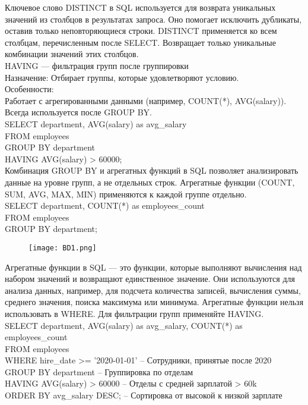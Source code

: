 \noindent Ключевое слово DISTINCT в SQL используется для возврата уникальных значений из столбцов в результатах запроса. Оно помогает исключить дубликаты, оставив только неповторяющиеся строки. DISTINCT применяется ко всем столбцам, перечисленным после SELECT. Возвращает только уникальные комбинации значений этих столбцов. \\

\noindent HAVING — фильтрация групп после группировки \\
Назначение: Отбирает группы, которые удовлетворяют условию. \\
Особенности: \\
Работает с агрегированными данными (например, COUNT(*), AVG(salary)). \\
Всегда используется после GROUP BY. \\
SELECT department, AVG(salary) as avg\_salary \\
FROM employees \\
GROUP BY department \\
HAVING AVG(salary) > 60000; \\

\noindent Комбинация GROUP BY и агрегатных функций в SQL позволяет анализировать данные на уровне групп, а не отдельных строк. Агрегатные функции (COUNT, SUM, AVG, MAX, MIN) применяются к каждой группе отдельно. \\
SELECT department, COUNT(*) as employees\_count \\
FROM employees \\
GROUP BY department; \\
\begin{figure}[H]
    \centering
    \texttt{[image: BD1.png]}
\end{figure}

\noindent Агрегатные функции в SQL — это функции, которые выполняют вычисления над набором значений и возвращают единственное значение. Они используются для анализа данных, например, для подсчета количества записей, вычисления суммы, среднего значения, поиска максимума или минимума. Агрегатные функции нельзя использовать в WHERE. Для фильтрации групп применяйте HAVING. \\
SELECT department, AVG(salary) as avg\_salary, COUNT(*) as employees\_count \\
FROM employees \\
WHERE hire\_date >= '2020-01-01'  -- Сотрудники, принятые после 2020 \\
GROUP BY department              -- Группировка по отделам \\
HAVING AVG(salary) > 60000      -- Отделы с средней зарплатой > 60k \\
ORDER BY avg\_salary DESC;       -- Сортировка от высокой к низкой зарплате \\

